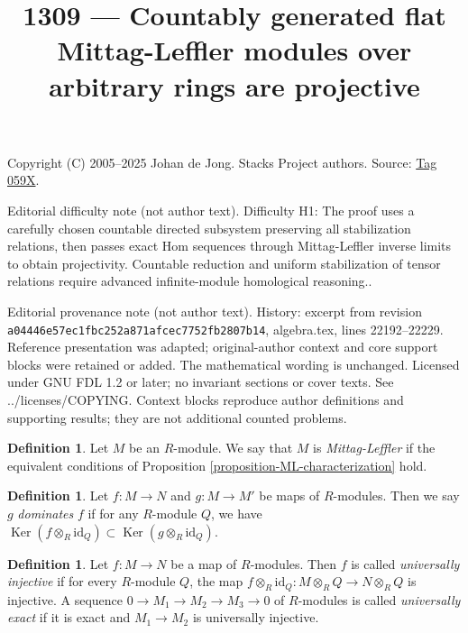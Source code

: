 \documentclass{amsart}
\theoremstyle{plain}
\theoremstyle{definition}
\newtheorem{definition}[subsection]{Definition}
\theoremstyle{remark}
\numberwithin{equation}{subsection}
\def\Ker{\mathop{\mathrm{Ker}}}
\begin{document}
\title[Stacks Project, Tag 059X]{1309 --- Countably generated flat Mittag-Leffler modules over arbitrary rings are projective}
\maketitle
\noindent Copyright (C) 2005--2025 Johan de Jong. Stacks Project authors. Source: \href{https://stacks.math.columbia.edu/tag/059X}{Tag 059X}.

\noindent Editorial difficulty note (not author text). Difficulty H1: The proof uses a carefully chosen countable directed subsystem preserving all stabilization relations, then passes exact Hom sequences through Mittag-Leffler inverse limits to obtain projectivity. Countable reduction and uniform stabilization of tensor relations require advanced infinite-module homological reasoning..

\noindent Editorial provenance note (not author text). History: excerpt from revision \texttt{a0444\allowbreak 6e57e\allowbreak c1fbc\allowbreak 252a8\allowbreak 71afc\allowbreak ec775\allowbreak 2fb28\allowbreak 07b14}, algebra.tex, lines 22192--22229. Reference presentation was adapted; original-author context and core support blocks were retained or added. The mathematical wording is unchanged. Licensed under GNU FDL 1.2 or later; no invariant sections or cover texts. See ../licenses/COPYING. Context blocks reproduce author definitions and supporting results; they are not additional counted problems.

\begin{definition}
\label{definition-mittag-leffler-module}
Let $M$ be an $R$-module.  We say that $M$ is {\it Mittag-Leffler} if the
equivalent conditions of
Proposition \ref{proposition-ML-characterization}
hold.
\end{definition}

\begin{definition}
\label{definition-domination}
Let $f: M \to N$ and $g: M \to M'$ be maps of $R$-modules.
Then we say $g$ {\it dominates} $f$ if for any $R$-module $Q$, we have $\Ker(f
\otimes_R \text{id}_Q) \subset \Ker(g \otimes_R \text{id}_Q)$.
\end{definition}

\begin{definition}
\label{definition-universally-injective}
Let $f: M \to N$ be a map of $R$-modules.  Then $f$ is called
{\it universally injective} if for every $R$-module $Q$, the map $f
\otimes_R \text{id}_Q: M \otimes_R Q \to N \otimes_R Q$
is injective.  A sequence $0 \to M_1 \to M_2 \to M_3
\to 0$ of $R$-modules is called {\it universally exact} if it is exact
and $M_1 \to M_2$ is universally injective.
\end{definition}
\end{document}
